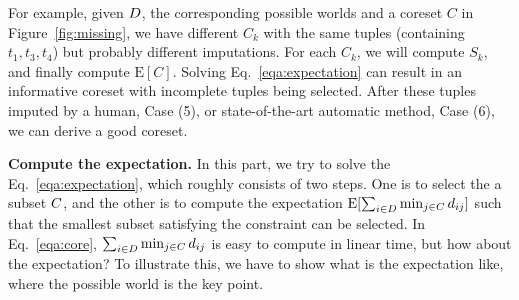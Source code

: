 For example, given $D$, the corresponding possible worlds and a coreset $C$ in Figure~\ref{fig:missing}, we have different $C_k$ with the same tuples (containing $t_1, t_3, t_4$) but probably different imputations. For each $C_k$, we will compute $S_k$, and finally compute $\mathrm{E}[C]$. Solving Eq.~\ref{eqa:expectation} can result in an informative coreset with incomplete tuples being selected. After these tuples imputed by a human, \ie Case (5), or state-of-the-art automatic method, \ie Case (6), we can derive a good coreset.


















\iffalse

\noindent \textbf{Compute the expectation.}  In this part, we try to solve the Eq.~\ref{eqa:expectation}, which roughly consists of  two steps. One is to  select the a subset $C$, and the other is to compute the expectation $\mathrm{E}[\sum_{i\in D} \min_{j\in C} d_{ij}]$ such that the smallest subset satisfying the constraint can be selected. In Eq.~\ref{eqa:core}, $\sum_{i\in D} \min_{j\in C} d_{ij}$ is easy to compute in linear time, but how about the expectation? To illustrate this, we have to show what is the expectation like, where the possible world is the key point.







